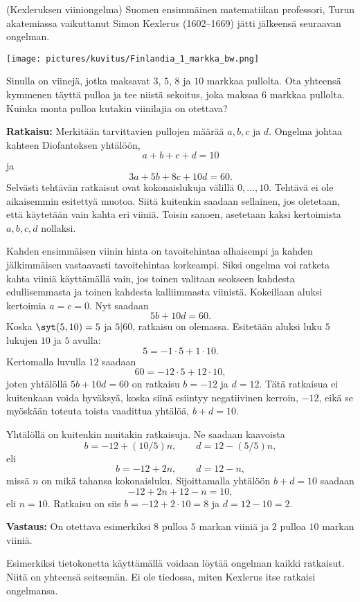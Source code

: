 \begin{esimerkki}
 (Kexleruksen viiniongelma)
Suomen ensimmäinen matematiikan professori, Turun
akatemiassa vaikuttanut Simon Kexlerus (1602--1669) jätti
jälkeensä seuraavan ongelman.

\medskip

\begin{center}
\texttt{[image: pictures/kuvitus/Finlandia\_1\_markka\_bw.png]}
\end{center}

\medskip

Sinulla on viinejä, jotka maksavat $3$, $5$, $8$ ja $10$
markkaa pullolta. Ota yhteensä kymmenen täyttä pulloa ja
tee niistä sekoitus, joka maksaa $6$ markkaa pullolta.
Kuinka monta pulloa kutakin viinilajia on otettava?

{\bf Ratkaisu:} Merkitään tarvittavien pullojen määrää
$a,b,c$ ja $d$. Ongelma johtaa kahteen Diofantoksen
yhtälöön,
\[
a+b+c+d = 10
\]
ja
\[
3a+5b+8c+10d = 60.
\]
Selvästi tehtävän ratkaisut ovat kokonaislukuja välillä
$0,\ldots,10$. Tehtävä ei ole aikaisemmin esitettyä
muotoa. Siitä kuitenkin saadaan sellainen, jos oletetaan,
että käytetään vain kahta eri viiniä. Toisin sanoen,
asetetaan kaksi kertoimista $a,b,c,d$ nollaksi.

Kahden ensimmäisen viinin hinta on tavoitehintaa
alhaisempi ja kahden jälkimmäisen vastaavasti
tavoitehintaa korkeampi. Siksi ongelma voi ratketa kahta
viiniä käyttämällä vain, jos toinen valitaan seokseen
kahdesta edullisemmasta ja toinen kahdesta kalliimmasta
viinistä. Kokeillaan aluksi kertoimia $a=c=0$. Nyt
saadaan
\[
5b + 10d = 60.
\]
Koska $\syt(5,10)=5$ ja $5|60$, ratkaisu on olemassa.
Esitetään aluksi luku $5$ lukujen $10$ ja $5$ avulla:
\[
5 = -1 \cdot 5 + 1\cdot 10.
\]
Kertomalla luvulla $12$ saadaan
\[
60 = -12\cdot 5 + 12\cdot 10,
\]
joten yhtälöllä $5b+10d=60$ on ratkaisu $b=-12$ ja $d=12$. Tätä ratkaisua ei kuitenkaan voida hyväksyä, koska siinä esiintyy negatiivinen kerroin, $-12$, eikä se myöskään toteuta toista vaadittua yhtälöä, $b+d=10$.

Yhtälöllä on kuitenkin muitakin ratkaisuja. Ne saadaan
kaavoista
\[
b= -12 + (10/5)n, \qquad d=12 - (5/5)n,
\]
eli
\[
b= -12 + 2n, \qquad d=12 - n,
\]
missä $n$ on mikä tahansa kokonaisluku. Sijoittamalla
yhtälöön $b+d=10$ saadaan
\[
-12 + 2n + 12 - n = 10,
\]
eli $n=10$. Ratkaisu on siis $b=-12+2 \cdot 10=8$ ja
$d=12-10=2$.

{\bf Vastaus:} On otettava esimerkiksi $8$ pulloa $5$
markan viiniä ja $2$ pulloa $10$ markan viiniä.

Esimerkiksi tietokonetta käyttämällä voidaan löytää
ongelman kaikki ratkaisut. Niitä on yhteensä seitsemän.
Ei ole tiedossa, miten Kexlerus itse ratkaisi ongelmansa.
\end{esimerkki}


